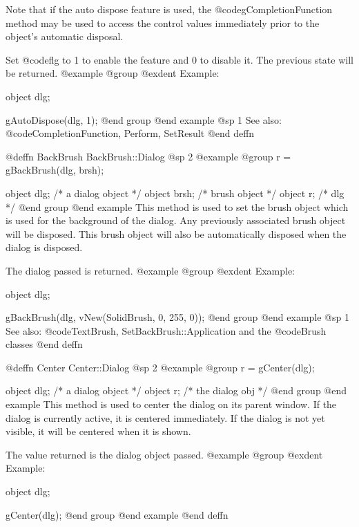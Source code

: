 Note that if the auto dispose feature is used, the @code{gCompletionFunction}
method may be used to access the control values immediately prior to
the object's automatic disposal.

Set @code{flg} to 1 to enable the feature and 0 to disable it.  The
previous state will be returned.
@example
@group
@exdent Example:

object  dlg;

gAutoDispose(dlg, 1);
@end group
@end example
@sp 1
See also:  @code{CompletionFunction, Perform, SetResult}
@end deffn














@deffn {BackBrush} BackBrush::Dialog
@sp 2
@example
@group
r = gBackBrush(dlg, brsh);

object  dlg;    /*  a dialog object   */
object  brsh;   /*  brush object      */
object  r;      /*  dlg               */
@end group
@end example
This method is used to set the brush object which is used for the
background of the dialog.  Any previously associated brush object will
be disposed.  This brush object will also be automatically disposed when
the dialog is disposed.

The dialog passed is returned.
@example
@group
@exdent Example:

object  dlg;

gBackBrush(dlg, vNew(SolidBrush, 0, 255, 0));
@end group
@end example
@sp 1
See also:  @code{TextBrush, SetBackBrush::Application}
        and the @code{Brush} classes
@end deffn










@deffn {Center} Center::Dialog
@sp 2
@example
@group
r = gCenter(dlg);

object  dlg;   /*  a dialog object  */
object  r;     /*  the dialog obj   */
@end group
@end example
This method is used to center the dialog on its parent window.  If the
dialog is currently active, it is centered immediately.  If the dialog
is not yet visible, it will be centered when it is shown.

The value returned is the dialog object passed.
@example
@group
@exdent Example:

object  dlg;

gCenter(dlg);
@end group
@end example
@end deffn




